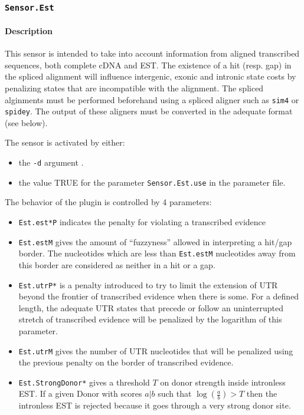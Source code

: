 
\subsubsection{\texttt{Sensor.Est}}
\label{plugest}

\paragraph{Description}

This sensor is intended to take into account information from aligned
transcribed sequences, both complete cDNA and EST. The existence of a
hit (resp. gap) in the spliced alignment will influence intergenic,
exonic and intronic state costs by penalizing states that are
incompatible with the alignment. The spliced alginments must be
performed beforehand using a spliced aligner such as \texttt{sim4} or
\texttt{spidey}. The output of these aligners must be converted in the
adequate format (see below).

The sensor is activated by either:
\begin{itemize}
\item the \texttt{-d} argument .
\item the value TRUE for the parameter \texttt{Sensor.Est.use} in
  the parameter file.
\end{itemize}

The behavior of the plugin is controlled by 4 parameters:
\begin{itemize}
\item \texttt{Est.est*P} indicates the penalty for violating a transcribed
  evidence
\item \texttt{Est.estM} gives the amount of ``fuzzyness'' allowed in
  interpreting a hit/gap border. The nucleotides which are less than
  \texttt{Est.estM} nucleotides away from this border are considered
  as neither in a hit or a gap.
\item \texttt{Est.utrP*} is a penalty introduced to try to limit the
  extension of UTR beyond the frontier of transcribed evidence when
  there is some. For a defined length, the adequate UTR states that
  precede or follow an uninterrupted stretch of transcribed evidence
  will be penalized by the logarithm of this parameter.
\item \texttt{Est.utrM} gives the number of UTR nucleotides that will
  be penalized using the previous penalty on the border of transcribed
  evidence.
\item \texttt{Est.StrongDonor*} gives a threshold $T$ on donor strength
  inside intronless EST. If a given Donor with scores $a|b$ such that
  $\log(\frac{a}{b}) >T$ then the intronless EST is rejected because
  it goes through a very strong donor site.
\end{itemize}

